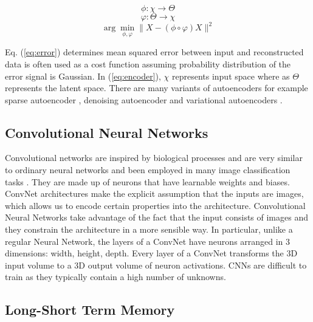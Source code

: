 \documentclass[a4paper,11pt,titlepage,drop]{article}%
\begin{document}
\begin{equation}
\label{eq:encoder}
\phi : \chi \xrightarrow{} 	\Theta
\end{equation}
\begin{equation}
		\label{eq:decoder}
					\varphi : \Theta  \xrightarrow{} \chi
\end{equation}
\begin{equation}
		\label{eq:error}
					\arg \min \limits_{\phi , \varphi} \parallel{X - (\phi \circ \varphi)X}\parallel^2				
\end{equation}

Eq. (\ref{eq:error}) determines mean squared error between input and reconstructed data is often used as a cost function assuming probability distribution of the error signal is Gaussian. In  (\ref{eq:encoder}), $\chi$ represents input space where as $\Theta$ represents the latent space. There are many variants of autoencoders for example sparse autoencoder \cite{ng}, denoising autoencoder \cite{denoise} and variational autoencoders \cite{autoen}.
 
\subsection{Convolutional Neural Networks} 

Convolutional networks are inspired by biological processes and are very similar to ordinary neural networks and been employed in many image classification tasks \cite{cnn} . They are made up of neurons that have learnable weights and biases. ConvNet architectures make the explicit assumption that the inputs are images, which allows us to encode certain properties into the architecture. Convolutional Neural Networks take advantage of the fact that the input consists of images and they constrain the architecture in a more sensible way. In particular, unlike a regular Neural Network, the layers of a ConvNet have neurons arranged in 3 dimensions: width, height, depth. Every layer of a ConvNet transforms the 3D input volume to a 3D output volume of neuron activations. CNNs are difficult to train as they typically contain a high number of unknowns.

\subsection{Long-Short Term Memory } 
\end{document}
